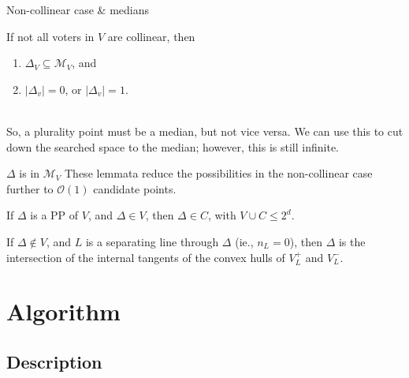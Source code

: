 \documentclass{beamer}
\newcommand{\order}[1]{\ensuremath{\mathcal{O}(#1)}}
\begin{document}
\begin{frame}{Non-collinear case \& medians}
  \begin{lemma}  %
    If not all voters in \(V\) are collinear, then
    \begin{enumerate}
    \item \(\Delta_V \subseteq \mathcal{M}_V\), and
    \item \(\lvert\Delta_{v}\rvert = 0\), or \(\lvert\Delta_{v}\rvert = 1\).
    \end{enumerate}
  \end{lemma} ~\\
  So, a plurality point must be a median, but not vice versa.  We can use this to cut down the
  searched space to the median; however, this is still infinite.
\end{frame}


\begin{frame}{\(\Delta\) is in \(\mathcal{M}_V\)}
  These lemmata reduce the possibilities in the non-collinear case further to \order{1} candidate
  points.
  \begin{lemma}[\(\Delta \in V\)]  %
    If \(\Delta\) is a PP of \(V\), and \(\Delta \in V\), then \(\Delta \in C\), with
    \(V \cup C \leq 2^d\).
  \end{lemma}
  \begin{lemma} %
    If \(\Delta \not\in V\), and \(L\) is a separating line through \(\Delta\) (ie., \(n_L = 0\)),
    then \(\Delta\) is the intersection of the internal tangents of the convex hulls of \(V_L^+\) and
    \(V_L^-\).
  \end{lemma}
\end{frame}


\section{Algorithm}

\subsection{Description}
\let\oldcomment\Comment
\renewcommand{\Comment}[1]{\oldcomment{\textit{#1}}}
\end{document}
